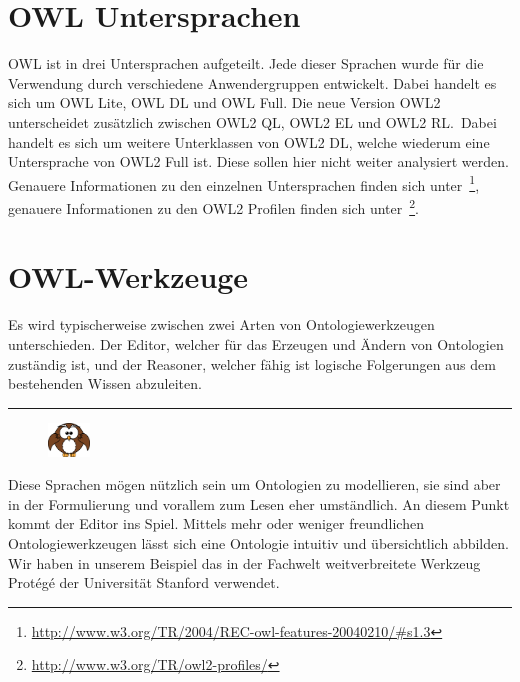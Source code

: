 \section{OWL Untersprachen}
\label{sec:owl_owl_Untersprachen}
OWL ist in drei Untersprachen aufgeteilt. Jede dieser Sprachen wurde für die Verwendung durch verschiedene Anwendergruppen entwickelt. Dabei handelt es sich um OWL Lite, OWL DL und OWL Full. Die neue Version OWL2 unterscheidet zusätzlich zwischen OWL2 QL, OWL2 EL und OWL2 RL.\ Dabei handelt es sich um weitere Unterklassen von OWL2 DL, welche wiederum eine Untersprache von OWL2 Full ist. Diese sollen hier nicht weiter analysiert werden. Genauere Informationen zu den einzelnen Untersprachen finden sich unter~\footnote{\url{http://www.w3.org/TR/2004/REC-owl-features-20040210/\#s1.3}}, genauere Informationen zu den OWL2 Profilen finden sich unter~\footnote{\url{http://www.w3.org/TR/owl2-profiles/}}.

\section{OWL-Werkzeuge}
\label{sec:owl_owl_OwlTools}
Es wird typischerweise zwischen zwei Arten von Ontologiewerkzeugen unterschieden. Der Editor, welcher für das Erzeugen und Ändern von Ontologien zuständig ist, und der Reasoner, welcher fähig ist logische Folgerungen aus dem bestehenden Wissen abzuleiten.

\noindent\rule[1ex]{\textwidth}{1pt}
\begin{figure}
    \vspace{-19pt}
    \includegraphics[width=0.1\textwidth]{bilder/owl.png}
\end{figure}
Diese Sprachen mögen nützlich sein um Ontologien zu modellieren, sie sind aber in der Formulierung und vorallem zum Lesen eher umständlich. An diesem Punkt kommt der Editor ins Spiel. Mittels mehr oder weniger freundlichen Ontologiewerkzeugen lässt sich eine Ontologie intuitiv und übersichtlich abbilden. Wir haben in unserem Beispiel das in der Fachwelt weitverbreitete Werkzeug Protégé der Universität Stanford verwendet.

